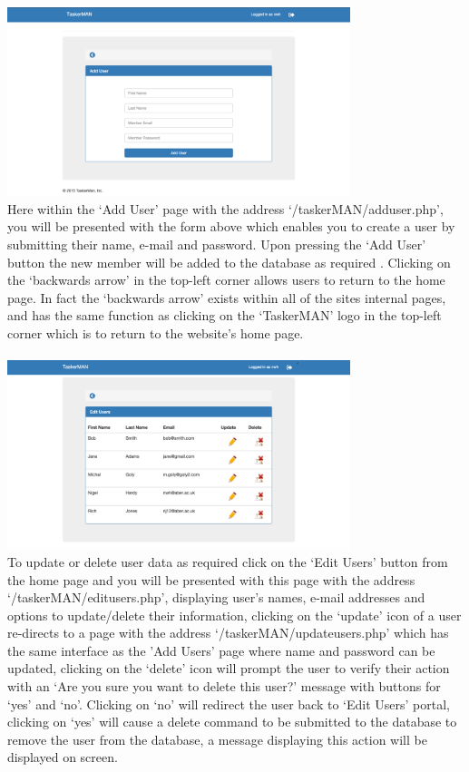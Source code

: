 \documentclass{project}
\begin{document}
\newline
\includegraphics[width=0.75\textwidth, center]{images/5.2/TaskerMANAddUser} \\
Here within the `Add User' page with the address `/taskerMAN/adduser.php', you will be presented with the form above which enables you to create a user by submitting their name, e-mail and password. Upon pressing the `Add User' button the new member will be added to the database as required \cite{se.qa.rs}. Clicking on the `backwards arrow' in the top-left corner allows users to return to the home page. In fact the `backwards arrow' exists within all of the sites internal pages, and has the same function as clicking on the `TaskerMAN' logo in the top-left corner which is to return to the website's home page.\\~\\
\newline
\includegraphics[width=0.75\textwidth, center]{images/5.2/TaskerMANEditUser} \\
To update or delete user data as required \cite{se.qa.rs} click on the `Edit Users' button from the home page and you will be presented with this page with the address `/taskerMAN/editusers.php', displaying user's names, e-mail addresses and options to update/delete their information, clicking on the `update' icon of a user re-directs to a page with the address `/taskerMAN/updateusers.php' which has the same interface as the 'Add Users' page where name and password can be updated, clicking on the `delete' icon will prompt the user to verify their action with an `Are you sure you want to delete this user?' message with buttons for `yes' and `no'. Clicking on `no' will redirect the user back to `Edit Users' portal, clicking on `yes' will cause a delete command to be submitted to the database to remove the user from the database, a message displaying this action will be displayed on screen. \\~\\
\end{document}
